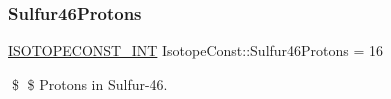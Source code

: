 \subsubsection{\texorpdfstring{Sulfur46\+Protons}{Sulfur46Protons}}
{\footnotesize\ttfamily \mbox{\hyperlink{group___isotope_const-_macros_ga5f18360b3e99483a35c32d789e62621c}{I\+S\+O\+T\+O\+P\+E\+C\+O\+N\+S\+T\+\_\+\+I\+NT}} Isotope\+Const\+::\+Sulfur46\+Protons = 16}

\$ \$ Protons in Sulfur-\/46. 